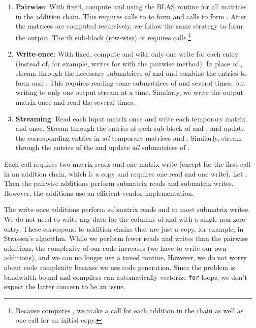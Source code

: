 \documentclass[preprint]{sigplanconf}
\begin{document}
\begin{enumerate}
\item \textbf{Pairwise}:
With  fixed, compute  and  using the  BLAS routine for all matrices in the addition chain.
This requires  calls to  to form  and  calls to form . 
After the  matrices are computed recursively, we follow the same strategy to form the output.
The th sub-block (row-wise) of  requires   calls.\footnote{Because  computes , we make a call for each addition in the chain as well as one call for an initial copy.}


\item \textbf{Write-once}: With  fixed, compute  and  with only one write for each entry (instead of, for example,  writes for  with the pairwise method).
In place of , stream through the necessary submatrices of  and  and combine the entries to form  and .
This requires reading some submatrices of  and  several times,
but writing to only one output stream at a time.
Similarly, we write the output matrix  once and read the  several times.

\item \textbf{Streaming}: Read each input matrix once and write each temporary matrix  and  once.  Stream through the entries of each sub-block of  and , and update the corresponding entries in \emph{all} temporary matrices  and .
Similarly, stream through the entries of the  and update \emph{all} submatrices of .
\end{enumerate}

Each  call requires two matrix reads and one matrix write (except for the first call in an addition chain, which is a copy and requires one read and one write).
Let .
Then the pairwise additions perform  submatrix reads and  submatrix writes.
However, the additions use an efficient vendor implementation.

The write-once additions perform  submatrix reads and at most  submatrix writes.
We do not need to write any data for the columns of  and  with a single non-zero entry.
These correspond to addition chains that are just a copy, for example,  in Strassen's algorithm.
While we perform fewer reads and writes than the pairwise additions,
the complexity of our code increases (we have to write our own additions), and we can no longer use a tuned  routine.
However, we do not worry about code complexity because we use code generation.
Since the problem is bandwidth-bound and compilers can automatically vectorize \texttt{for} loops, we don't expect the latter concern to be an issue.
\end{document}
